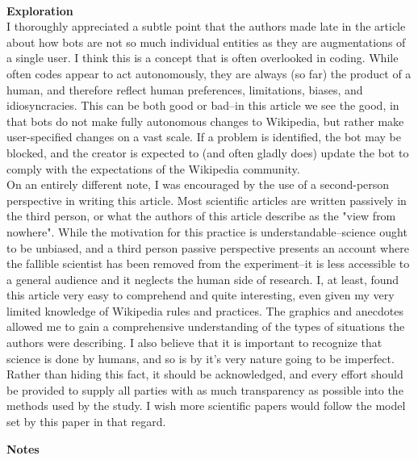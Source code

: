 \documentclass{report}
\newcommand{\tab}{\-\hspace{1cm}}
\begin{document}
\-\\
\textbf{Exploration}\\
\tab I thoroughly appreciated a subtle point that the authors made late in the article about how bots are not so much individual entities as they are augmentations of a single user. I think this is a concept that is often overlooked in coding. While often codes appear to act autonomously, they are always (so far) the product of a human, and therefore reflect human preferences, limitations, biases, and idiosyncracies. This can be both good or bad--in this article we see the good, in that bots do not make fully autonomous changes to Wikipedia, but rather make user-specified changes on a vast scale. If a problem is identified, the bot may be blocked, and the creator is expected to (and often gladly does) update the bot to comply with the expectations of the Wikipedia community.\\
\tab On an entirely different note, I was encouraged by the use of a second-person perspective in writing this article. Most scientific articles are written passively in the third person, or what the authors of this article describe as the "view from nowhere". While the motivation for this practice is understandable--science ought to be unbiased, and a third person passive perspective presents an account where the fallible scientist has been removed from the experiment--it is less accessible to a general audience and it neglects the human side of research. I, at least, found this article very easy to comprehend and quite interesting, even given my very limited knowledge of Wikipedia rules and practices. The graphics and anecdotes allowed me to gain a comprehensive understanding of the types of situations the authors were describing. I also believe that it is important to recognize that science is done by humans, and so is by it's very nature going to be imperfect. Rather than hiding this fact, it should be acknowledged, and every effort should be provided to supply all parties with as much transparency as possible into the methods used by the study. I wish more scientific papers would follow the model set by this paper in that regard. 

\newpage

\textbf{Notes}\\
\end{document}
